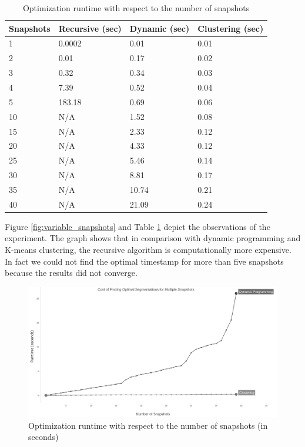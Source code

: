 			\begin {center}
			\begin{table}
				\centering
				\caption{Optimization runtime with respect to the number of snapshots}
				\label {table:variable_snapshots}
				\begin{tabular}{p{2cm}p{3cm}p{3cm}p{3cm}}
					\hline
					Snapshots & Recursive (sec)     & Dynamic (sec) & Clustering (sec) \\ \hline
					1 & 0.0002    & 0.01  & 0.01  \\  
					2 & 0.01    & 0.17  & 0.02  \\
					3 & 0.32    & 0.34  & 0.03  \\
					4 & 7.39 & 0.52  & 0.04  \\
					5 & 183.18 & 0.69  & 0.06 \\
					10 & N/A    & 1.52  & 0.08  \\
					15 & N/A & 2.33  & 0.12  \\ 
					20 & N/A & 4.33  & 0.12  \\ 
					25 & N/A & 5.46  & 0.14  \\ 
					30 & N/A & 8.81  & 0.17  \\
					35 & N/A & 10.74  & 0.21  \\
					40 & N/A & 21.09  & 0.24  \\\hline
				\end{tabular}
			\end{table}
			\end{center}

			Figure \ref{fig:variable_snapshots} and Table \ref{table:variable_snapshots} depict the observations of the experiment. The graph shows that in comparison with dynamic programming and K-means clustering, the recursive algorithm is computationally more expensive. In fact we could not find the optimal timestamp for more than five snapshots because the results did not converge.

			\begin{figure}
				\centering
				\includegraphics[width=\textwidth]{figs/multiSnapDouble.jpg}
				\caption{Optimization runtime with respect to the number of snapshots (in seconds)}
				\label{fig:variable_snapshots_2}
			\end{figure} 

